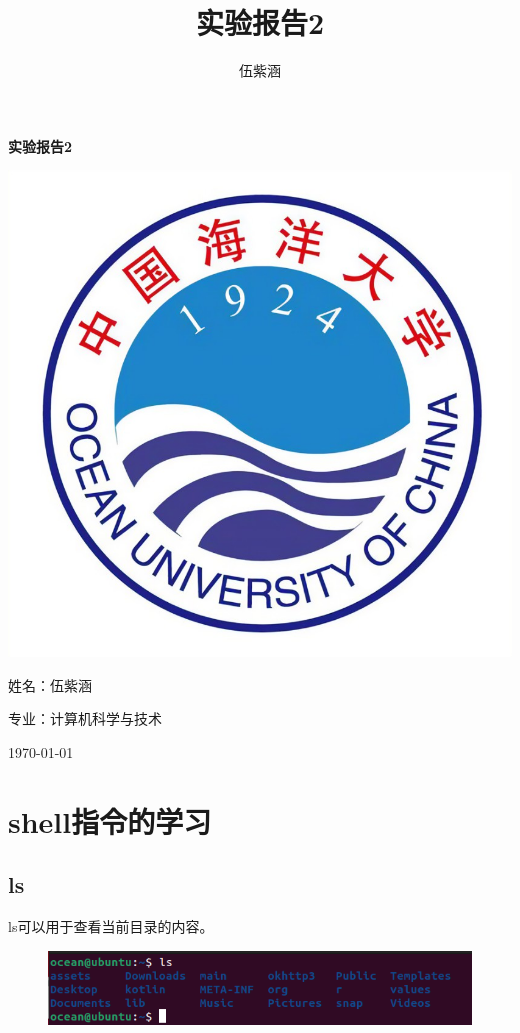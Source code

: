 \documentclass{article}
\title{实验报告2}
\author{伍紫涵}
\begin{document}
\renewcommand{\maketitle}{
    \begin{titlepage}
        \centering
        {\Huge\bfseries 实验报告2 \par}
        \vspace{2cm}
        \includegraphics[width=0.7\linewidth]{ouc.png} \par
        \vspace{2cm}
        {\LARGE 姓名：伍紫涵 \par}
        \vspace{1cm}
        {\LARGE 专业：计算机科学与技术 \par}
        \vspace{1cm}
        {\large \today \par}
    \end{titlepage}
}
\maketitle
\begin{titlepage}
{\hypersetup{hidelinks}\tableofcontents}
\end{titlepage}
\section{shell指令的学习}
\subsection{ls}
ls可以用于查看当前目录的内容。
\begin{figure}[H]
    \centering
    \includegraphics[width=1\linewidth]{ls.png}
\end{figure}
\end{document}

